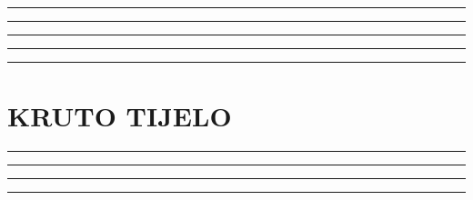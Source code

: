 \documentclass[10pt]{book}
\newcounter{zadatak} %
\newcounter{cjelina}
\begin{document}


{\color{boja} \rule{\linewidth}{0.3mm} }

\vspace{0.2cm}



{\color{boja} \rule{\linewidth}{0.3mm} }




\vspace{1cm}


{\color{boja} \rule{\linewidth}{0.3mm} }



\vspace{1cm}


{\color{boja} \rule{\linewidth}{0.3mm} }


\vspace{1cm}


{\color{boja} \rule{\linewidth}{0.3mm} }



\newpage
\chapter{KRUTO TIJELO}
\setcounter{zadatak}{0}




{\color{boja} \rule{\linewidth}{0.3mm} }

\vspace{0.2cm} 




{\color{boja} \rule{\linewidth}{0.3mm} }

\vspace{0.2cm}





{\color{boja} \rule{\linewidth}{0.3mm} }


\vspace{1cm}


{\color{boja} \rule{\linewidth}{0.3mm} }

\end{document}
